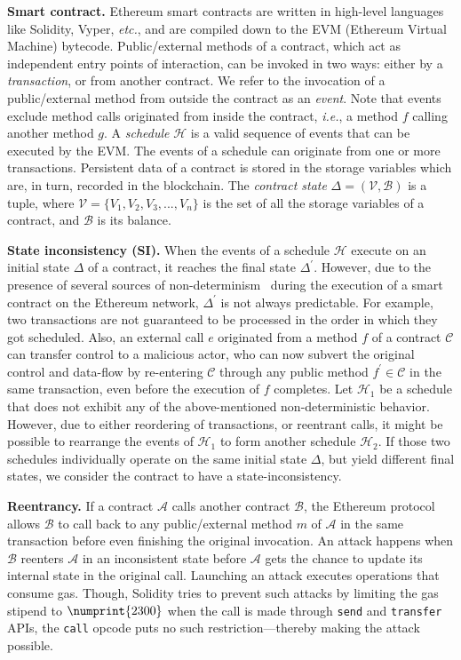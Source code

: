 \documentclass[conference, romanappendices]{tex/IEEEtran}
\theoremstyle{bfnote}
\newcommand{\solidity}{{\sc Solidity}\xspace}
\newcommand{\vyper}{{\sc Vyper}\xspace}
\newcommand{\smart}{smart contract}
\newcommand{\ethereum}{Ethereum}
\newcommand{\si}{{state-inconsistency}\xspace}
\newcommand{\etc}{\textit{etc.}}
\newcommand{\ie}{\textit{i.e.}}
\let\num\numprint
\begin{document}
\noindent
\textbf{Smart contract.}
\ethereum{} \smart s are written in high-level languages like \solidity, \vyper, \etc, and are compiled down to the {EVM\EndAccSupp{}} (\ethereum{} Virtual Machine) bytecode.
Public/external methods of a contract, which act as independent entry points of interaction, can be invoked in two ways: either by a \textit{transaction}, or from another contract.
We refer to the invocation of a public/external method from outside the contract as an \textit{event}.
Note that events exclude method calls originated from inside the contract, \ie, a method $f$ calling another method $g$.
A \textit{schedule} $\mathcal{H}$ is a valid sequence of events that can be executed by the EVM.
The events of a schedule can originate from one or more transactions.
Persistent data of a contract is stored in the storage variables which are, in turn, recorded in the blockchain.
The \textit{contract state} $\Delta = (\mathcal{V}, \mathcal{B})$ is a tuple, where $\mathcal{V} = \{V_1, V_2, V_3,..., V_n\}$ is the set of all the storage variables of a contract, and $\mathcal{B}$ is its balance.


\noindent
\textbf{State inconsistency (SI).}
When the events of a schedule $\mathcal{H}$ execute on an initial state $\Delta$ of a contract, it reaches the final state $\Delta^\prime$.
However, due to the presence of several sources of non-determinism~\cite{NPChecker} during the execution of a \smart{} on the \ethereum{} network, $\Delta^\prime$ is not always predictable.
For example,
two transactions are not guaranteed to be processed in the order in which they got scheduled.
Also, an external call $e$ originated from a method $f$ of a contract $\mathcal{C}$ can transfer control to a malicious actor, who can now subvert the original control and data-flow by re-entering $\mathcal{C}$ through any public method $f^\prime \in \mathcal{C}$ in the same transaction, even before the execution of $f$ completes.
Let $\mathcal{H}_1$ be a schedule that does not exhibit any of the above-mentioned non-deterministic behavior.
However, due to either reordering of transactions, or reentrant calls, it might be possible to rearrange the events of $\mathcal{H}_1$ to form another schedule $\mathcal{H}_2$.
If those two schedules individually operate on the same initial state $\Delta$, but yield different final states, we consider the contract to have a \si.



\noindent
\textbf{Reentrancy.}
If a contract $\mathcal{A}$ calls another contract $\mathcal{B}$, the \ethereum{} protocol allows $\mathcal{B}$ to call back to any public/external method $m$ of $\mathcal{A}$ in the same transaction before even finishing the original invocation.
An attack happens when $\mathcal{B}$ reenters $\mathcal{A}$ in an inconsistent state before $\mathcal{A}$ gets the chance to update its internal state in the original call.
Launching an attack executes operations that consume gas.
Though, \solidity tries to prevent such attacks by limiting the gas stipend to $\num{2300}$ when the call is made through \texttt{send} and \texttt{transfer} APIs, the \texttt{call} opcode puts no such restriction---thereby making the attack possible.
\end{document}

